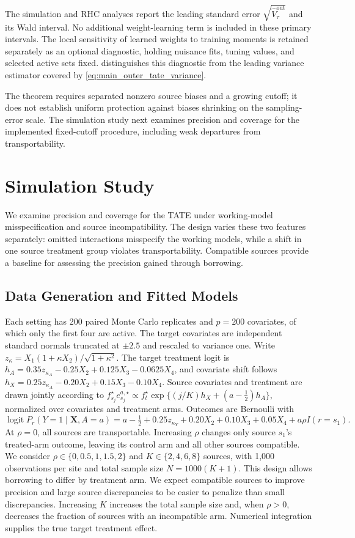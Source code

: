 \documentclass[12pt]{article}
\begin{document}
The simulation and RHC analyses report the leading standard error $\sqrt{\widehat V_\tau^{\mathrm{out}}}$ and its Wald interval. No additional weight-learning term is included in these primary intervals. The local sensitivity of learned weights to training moments is retained separately as an optional diagnostic, holding nuisance fits, tuning values, and selected active sets fixed.  distinguishes this diagnostic from the leading variance estimator covered by \cref{eq:main_outer_tate_variance}.

The theorem requires separated nonzero source biases and a growing cutoff; it does not establish uniform protection against biases shrinking on the sampling-error scale. The simulation study next examines precision and coverage for the implemented fixed-cutoff procedure, including weak departures from transportability.

\section{Simulation Study}\label{sec:simulations}

We examine precision and coverage for the TATE under working-model misspecification and source incompatibility. The design varies these two features separately: omitted interactions misspecify the working models, while a shift in one source treatment group violates transportability. Compatible sources provide a baseline for assessing the precision gained through borrowing.

\subsection{Data Generation and Fitted Models}
Each setting has 200 paired Monte Carlo replicates and $p=200$ covariates, of which only the first four are active. The target covariates are independent standard normals truncated at $\pm2.5$ and rescaled to variance one. Write $z_\kappa=X_1(1+\kappa X_2)/\sqrt{1+\kappa^2}$. The target treatment logit is $h_A=0.35z_{\kappa_A}-0.25X_2+0.125X_3-0.0625X_4$, and covariate shift follows $h_X=0.25z_{\kappa_A}-0.20X_2+0.15X_3-0.10X_4$. Source covariates and treatment are drawn jointly according to $f_{s_j}^\star e_{s_j}^{a,\star}\propto f_t^\star\exp\{(j/K)h_X+(a-\tfrac12)h_A\}$, normalized over covariates and treatment arms. Outcomes are Bernoulli with
\[
\operatorname{logit}P_r(Y=1\mid\boldsymbol X,A=a)
=a-\tfrac12+0.25z_{\kappa_Y}+0.20X_2+0.10X_3+0.05X_4
+a\rho I(r=s_1).
\]
At $\rho=0$, all sources are transportable. Increasing $\rho$ changes only source $s_1$'s treated-arm outcome, leaving its control arm and all other sources compatible. We consider $\rho\in\{0,0.5,1,1.5,2\}$ and $K\in\{2,4,6,8\}$ sources, with 1,000 observations per site and total sample size $N=1000(K+1)$. This design allows borrowing to differ by treatment arm. We expect compatible sources to improve precision and large source discrepancies to be easier to penalize than small discrepancies. Increasing $K$ increases the total sample size and, when $\rho>0$, decreases the fraction of sources with an incompatible arm. Numerical integration supplies the true target treatment effect.
\end{document}
